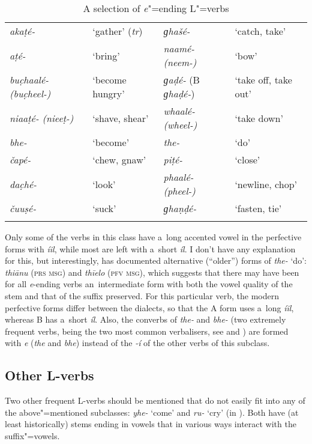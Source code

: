\begin{table}
\caption{A selection of \textit{e}"=ending L"=verbs}
\begin{tabularx}{\textwidth}{ Q Q Q Q }
\lsptoprule
\textit{akaṭé-} &
`gather' (\textit{tr}) &
\textit{ɡhašé-} &
`catch, take'\\
\textit{aṭé-} &
`bring' &
\textit{naamé- (neem-)} &
`bow'\\
\textit{buc̣haalé- (buc̣heel-)} &
`become hungry' &
\textit{ɡaḍé-} (B \textit{ɡhaḍé-}) &
`take off, take out'\\
\textit{niaaṭé- (nieeṭ-)} &
`shave, shear' &
\textit{whaalé- (wheel-)} &
`take down'\\
\textit{bhe-} &
`become' &
\textit{the-} &
`do'\\
\textit{čapé-} &
`chew, gnaw' &
\textit{piṭé-} &
`close'\\
\textit{dac̣hé-} &
`look' &
\textit{phaalé- (pheel-)} &
`newline, chop'\\
\textit{čuuṣé-} &
`suck' &
\textit{ɡhaṇḍé-} &
`fasten, tie' \\\lspbottomrule
\end{tabularx}
\label{tab:8-le}
\end{table}


Only some of the verbs in this class have a~long accented vowel in the perfective forms with
\textit{íil}, while most are left with a~short \textit{íl}. I don't have any explanation for
this, but interestingly, \citet[22--23]{morgenstierne1941} has documented alternative (``older'')
forms of \textit{the-} `do': \textit{thiānu} (\textsc{prs msg}) and \textit{thīelo}
(\textsc{pfv msg}), which suggests that there may have been for all \textit{e}-ending verbs
an~intermediate form with both the vowel quality of the stem and that of the suffix preserved. For
this particular verb, the modern perfective forms differ between the dialects, so that the A form
uses a~long \textit{íil}, whereas B has a~short \textit{íl}. Also, the converbs of
\textit{the-} and \textit{bhe-} (two extremely frequent verbs, being the two most common
verbalisers, see  and ) are formed with \textit{e}
(\textit{the} and \textit{bhe}) instead of the \textit{-í} of the other verbs of this subclass.


\subsection{Other L-verbs}
\label{subsec:8-3-4}


Two other frequent L-verbs should be mentioned that do not easily fit into any of the above"=mentioned subclasses: \textit{yhe-} `come' and \textit{ru-} `cry' (in ). Both have (at least historically) stems ending in vowels that in various ways interact with the suffix"=vowels. 


